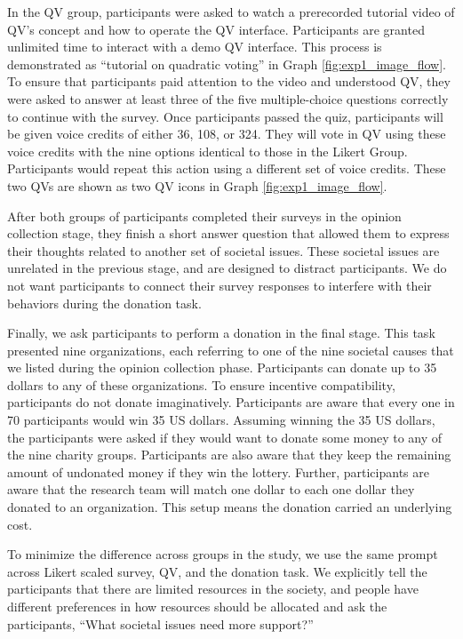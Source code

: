 In the QV group, 
participants were asked to watch 
a prerecorded tutorial video of QV's concept 
and how to operate the QV interface.
Participants are granted unlimited time 
to interact with a demo QV interface. 
This process is demonstrated as 
``tutorial on quadratic voting'' 
in Graph \ref{fig:exp1_image_flow}.
To ensure that participants paid attention to the video and understood QV, 
they were asked to answer at least three of the five multiple-choice questions 
correctly to continue with the survey.
Once participants passed the quiz, 
participants will be given voice credits of either 36, 108, or 324.
They will vote in QV using these voice credits 
with the nine options identical to those in the Likert Group.
Participants would repeat this action using a different set of voice credits.
These two QVs are shown as two QV icons in Graph \ref{fig:exp1_image_flow}.



After both groups of participants completed their surveys in the opinion collection stage, 
they finish a short answer question
that allowed them to express their thoughts 
related to another set of societal issues.
These societal issues are unrelated in the previous stage,
and are designed to distract participants.
We do not want participants to connect their survey responses
to interfere with their behaviors during the donation task.

Finally, 
we ask participants to perform a donation in the final stage.
This task presented nine organizations,
each referring to one of the nine societal causes
that we listed during the opinion collection phase.
Participants can donate up to 35 dollars 
to any of these organizations.
To ensure incentive compatibility, 
participants do not donate imaginatively.
Participants are aware that every one in 70 participants would win 35 US dollars.
Assuming winning the 35 US dollars, 
the participants were asked 
if they would want to donate some money 
to any of the nine charity groups.
Participants are also aware that 
they keep the remaining amount of undonated money 
if they win the lottery.
Further, participants are aware that 
the research team will match one dollar to each one dollar 
they donated to an organization.
This setup means the donation carried an underlying cost.

To minimize the difference across groups in the study, 
we use the same prompt across Likert scaled survey, QV, and the donation task.
We explicitly tell the participants that 
there are limited resources in the society, 
and people have different preferences 
in how resources should be allocated and ask the participants, 
``What societal issues need more support?''

